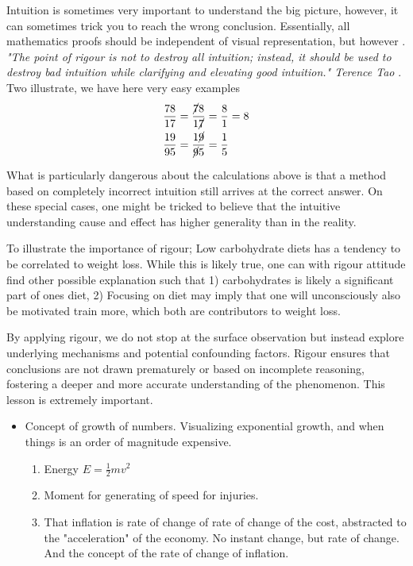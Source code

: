 \documentclass[10pt,conference]{IEEEtran}
\begin{document}
\begin{sloppy}
Intuition is sometimes very important to understand the big picture, however, it can sometimes trick you to reach the wrong conclusion. Essentially, all mathematics proofs should be independent of visual representation, but however . \textit{"The point of rigour is not to
destroy all intuition; instead, it should be used to destroy bad intuition while clarifying and elevating good intuition." Terence Tao }\cite{Tao2022}.
Two illustrate, we have here very easy examples \begin{align}
    \frac{78}{17}  &=  \frac{ \cancel{7}8}{ 1 \cancel{7}} = \frac{8}{1} = 8 \\
    \frac{19}{95}  &=  \frac{ 1\cancel{9}}{  \cancel{9} 5} = \frac{1}{5}
\end{align}

What is particularly dangerous about the calculations above is that a method based on completely incorrect intuition still arrives at the correct answer. On these special cases, one might be tricked to believe that the intuitive understanding cause
and effect has higher generality
than in the reality.

To illustrate the importance of rigour; Low carbohydrate diets has a tendency to be correlated to weight loss. While this is likely true, one can with rigour attitude find other possible explanation such that 1) carbohydrates is
likely a significant part of ones diet, 2) Focusing on diet may imply that one will unconsciously  also be motivated train more, which both are contributors to weight loss.

By applying rigour, we do not stop at the surface observation but instead explore underlying mechanisms and potential confounding factors. Rigour ensures that conclusions are not drawn prematurely or based on incomplete reasoning, fostering a deeper
and more accurate understanding of the phenomenon. This lesson is extremely important.


\begin{itemize}
    \item Concept of growth of numbers. Visualizing exponential growth, and when things is an order of magnitude expensive.
        \begin{enumerate}[label=\arabic*)]
            \item Energy $E = \frac{1}{2}mv^2$
            \item Moment for generating of speed for injuries.
            \item That inflation is rate of change of rate of change of the cost, abstracted to the "acceleration" of the economy. No instant change, but rate of change. And the concept of the rate of change of inflation.
        \end{enumerate}


\end{itemize}
\end{sloppy}
\end{document}
